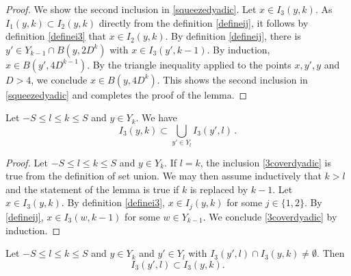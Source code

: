 \begin{proof}
We show the second inclusion in \eqref{squeezedyadic}. Let $x\in I_3(y,k)$. As $I_1(y,k)\subset I_2(y,k)$ directly from the definition \eqref{defineij}, it follows by definition \eqref{definei3} that $x\in I_2(y,k)$. By definition \eqref{defineij}, there is $y'\in Y_{k-1}\cap B(y,2D^k)$ with $x\in I_3(y',k-1)$. By induction, $x\in B(y', 4D^{k-1})$. By the triangle inequality applied to the points $x,y',y$ and $D>4$, we conclude $x\in B(y,4D^k)$. This shows the second inclusion in \eqref{squeezedyadic} and completes the proof of the lemma.
\end{proof}

\begin{lemma}
    \label{cover-by-cubes}
    Let $-S\le l\le k\le S$ and
    $y\in Y_k$.
    We have
    \begin{equation}\label{3coverdyadic}
    I_3(y,k)\subset \bigcup_{y'\in Y_l} I_3(y',l)\, .
    \end{equation}
\end{lemma}
\begin{proof}
    Let $-S\le l\le k\le S$ and $y\in Y_k$.
    If $l=k$, the inclusion \eqref{3coverdyadic}
    is true from the definition of set union.
    We may then assume inductively that $k>l$ and the statement of the lemma is true if $k$ is replaced by $k-1$.
    Let $x\in I_3(y,k)$.
    By definition \eqref{definei3}, $x\in I_j(y,k)$
    for some $j\in \{1,2\}$. By \eqref{defineij},
    $x\in I_3(w,k-1)$ for some $w\in Y_{k-1}$.
    We conclude \eqref{3coverdyadic} by induction.
\end{proof}

\begin{lemma}
    \label{dyadic-property}
    Let $-S\le l\le k\le S$ and $y\in Y_k$ and $y'\in Y_l$ with
    $I_3(y',l)\cap I_3(y,k)\neq \emptyset$. Then
    \begin{equation}
        \label{3dyadicproperty}
    I_3(y',l)\subset I_3(y,k).
    \end{equation}
\end{lemma}

